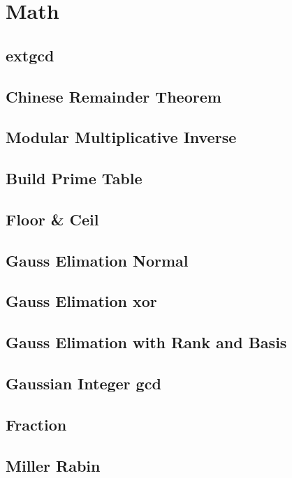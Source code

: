\section{Math}
\subsection{extgcd}

\subsection{Chinese Remainder Theorem}

\subsection{Modular Multiplicative Inverse}

\subsection{Build Prime Table}

\subsection{Floor \& Ceil}

\subsection{Gauss Elimation Normal}

\subsection{Gauss Elimation xor}

\subsection{Gauss Elimation with Rank and Basis}

\subsection{Gaussian Integer gcd}

\subsection{Fraction}

\subsection{Miller Rabin}


